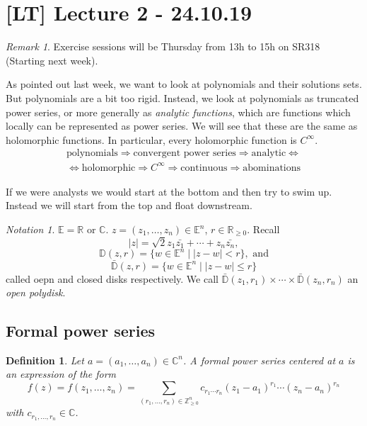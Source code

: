 \documentclass[12pt]{article}
\theoremstyle{darkgreentheorem}
\theoremstyle{darkbluedefinition}
\newtheorem{defn}[thm]{Definition}
\theoremstyle{darkredexample}
\theoremstyle{remark}
\newtheorem{rem}[thm]{Remark}
\newtheorem{nota}[thm]{Notation}
\newcommand{\Z}{\mathbb{Z}}
\newcommand{\R}{\mathbb{R}}
\newcommand{\1}{\mathbbm{1}}
\newcommand{\C}{\mathbb{C}}
\newcommand{\bbE}{\mathbb{E}}
\newcommand{\bbD}{\mathbb{D}}
\newcommand{\cbbD}{\bar{\mathbb{D}}}
\begin{document}
\section{[LT] Lecture 2 - 24.10.19}

\begin{rem}
    Exercise sessions will be Thursday from 13h to 15h on SR318 (Starting next week).
\end{rem}

As pointed out last week, we want to look at polynomials and their solutions sets.
But polynomials are a bit too rigid.
Instead, we look at polynomials as truncated power series, or more generally as \textit{analytic functions}, which are functions which locally can be represented as power series.
We will see that these are the same as holomorphic functions.
In particular, every holomorphic function is $C^{\infty}$.
\begin{multline*}
    \text{polynomials} \Rightarrow \text{convergent power series} \Rightarrow \text{analytic} \Leftrightarrow \\
    \Leftrightarrow \text{holomorphic} \Rightarrow C^{\infty}\Rightarrow \text{continuous} \Rightarrow \text{abominations}
\end{multline*}

If we were analysts we would start at the bottom and then try to swim up.
Instead we will start from the top and float downstream.

\begin{nota}
    $\bbE=\R$ or $\C$.
    $z=(z_{1},\ldots,z_{n})\in \bbE^{n}$, $r\in \R_{\geqslant 0}$.
    Recall
    \[ |z|=\sqrt{2}{z_{1}\bar{z_{1}}+\cdots + z_{n}\bar{z_{n}}}, \]
    \[ \bbD(z,r)=\{w\in \bbE^{n}\mid |z-w|<r\}, \text{ and} \]
    \[ \cbbD(z,r)=\{ w\in \bbE^{n}\mid |z-w|\leqslant r\} \]
    called oepn and closed disks respectively.
    We call $\cbbD(z_{1},r_{1})\times \cdots \times \cbbD(z_{n},r_{n})$ an \textit{open polydisk}.
\end{nota}

\subsection{Formal power series}

\begin{defn}
    Let $a=(a_{1},\ldots,a_{n})\in \C^{n}$.
    A \textit{formal power series} centered at $a$ is an expression of the form
    \[ f(z)=f(z_{1},\ldots,z_{n})=\sum_{(r_{1},\ldots, r_{n})\in \Z^{n}_{\geqslant 0}}c_{r_{1}\cdots r_{n}}(z_{1}-a_{1})^{r_{1}}\cdots (z_{n}-a_{n})^{r_{n}} \]
    with $c_{r_{1},\ldots,r_{n}}\in \C$.
\end{defn}
\end{document}
